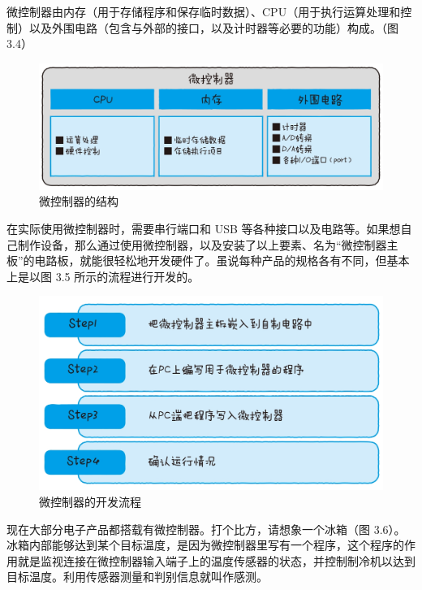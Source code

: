 \documentclass[12pt,UTF8]{ctexbook}
\begin{document}
微控制器由内存（用于存储程序和保存临时数据）、CPU（用于执行运算处理和控制）以及外围电路（包含与外部的接口，以及计时器等必要的功能）构成。（图 3.4）

\begin{figure}[htbp]
	\centering
	\includegraphics[width=1\linewidth]{55}
	\caption{微控制器的结构}
	\label{fig:1}
\end{figure}

在实际使用微控制器时，需要串行端口和 USB 等各种接口以及电路等。如果想自己制作设备，那么通过使用微控制器，以及安装了以上要素、名为“微控制器主板”的电路板，就能很轻松地开发硬件了。虽说每种产品的规格各有不同，但基本上是以图 3.5 所示的流程进行开发的。

\begin{figure}[htbp]
	\centering
	\includegraphics[width=1\linewidth]{56}
	\caption{微控制器的开发流程}
	\label{fig:1}
\end{figure}

现在大部分电子产品都搭载有微控制器。打个比方，请想象一个冰箱（图 3.6）。冰箱内部能够达到某个目标温度，是因为微控制器里写有一个程序，这个程序的作用就是监视连接在微控制器输入端子上的温度传感器的状态，并控制制冷机以达到目标温度。利用传感器测量和判别信息就叫作感测。
\end{document}
